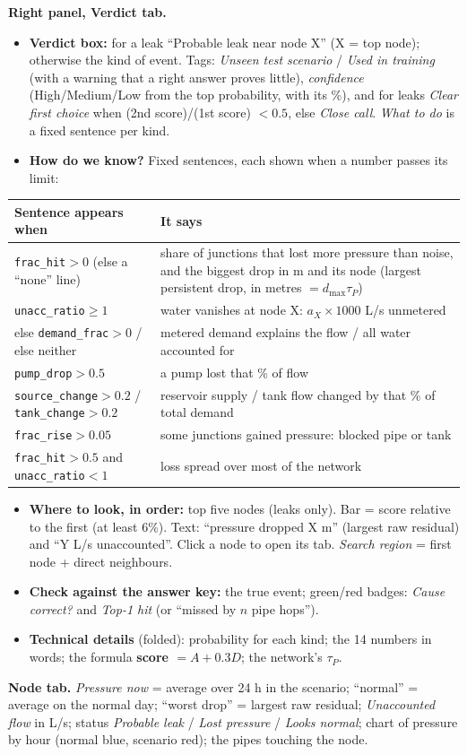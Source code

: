 \documentclass[11pt,a4paper]{article}
\newcommand{\code}[1]{\texttt{#1}}
\begin{document}
\textbf{Right panel, Verdict tab.}
\begin{itemize}
\item \textbf{Verdict box:} for a leak ``Probable leak near node X'' (X = top node); otherwise the kind of event. Tags: \emph{Unseen test scenario} / \emph{Used in training} (with a warning that a right answer proves little), \emph{confidence} (High/Medium/Low from the top probability, with its \%), and for leaks \emph{Clear first choice} when (2nd score)/(1st score) $<0.5$, else \emph{Close call}. \emph{What to do} is a fixed sentence per kind.
\item \textbf{How do we know?} Fixed sentences, each shown when a number passes its limit:
\end{itemize}
\begin{center}\small\begin{tabularx}{\linewidth}{@{}p{5.2cm}Y@{}}\toprule
Sentence appears when & It says \\\midrule
\code{frac\_hit}$>0$ (else a ``none'' line) & share of junctions that lost more pressure than noise, and the biggest drop in m and its node (largest persistent drop, in metres $=d_{\max}\tau_P$) \\
\code{unacc\_ratio}$\ge1$ & water vanishes at node X: $a_X\times1000$ L/s unmetered \\
else \code{demand\_frac}$>0$ / else neither & metered demand explains the flow / all water accounted for \\
\code{pump\_drop}$>0.5$ & a pump lost that \% of flow \\
\code{source\_change}$>0.2$ / \code{tank\_change}$>0.2$ & reservoir supply / tank flow changed by that \% of total demand \\
\code{frac\_rise}$>0.05$ & some junctions gained pressure: blocked pipe or tank \\
\code{frac\_hit}$>0.5$ and \code{unacc\_ratio}$<1$ & loss spread over most of the network \\\bottomrule\end{tabularx}\end{center}
\begin{itemize}
\item \textbf{Where to look, in order:} top five nodes (leaks only). Bar = score relative to the first (at least 6\%). Text: ``pressure dropped X m'' (largest raw residual) and ``Y L/s unaccounted''. Click a node to open its tab. \emph{Search region} = first node + direct neighbours.
\item \textbf{Check against the answer key:} the true event; green/red badges: \emph{Cause correct?} and \emph{Top-1 hit} (or ``missed by $n$ pipe hops'').
\item \textbf{Technical details} (folded): probability for each kind; the 14 numbers in words; the formula \textbf{score $=A+0.3D$}; the network's $\tau_P$.
\end{itemize}
\textbf{Node tab.} \emph{Pressure now} = average over 24 h in the scenario; ``normal'' = average on the normal day; ``worst drop'' = largest raw residual; \emph{Unaccounted flow} in L/s; status \emph{Probable leak} / \emph{Lost pressure} / \emph{Looks normal}; chart of pressure by hour (normal blue, scenario red); the pipes touching the node.
\end{document}
